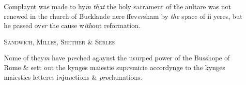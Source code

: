 \documentclass[12pt, a4paper]{book}
\begin{document}
				\marginpar[\vspace{0.5cm}{\textcolor{Gray}{ceremonies}}]{}
			
		\ifthenelse{\isodd{\thepage}}
		{\reversemarginpar}
		{\normalmarginpar}
		Complaynt was made to hy\textit{m that} the holy sacrament of the
 aultare was not renewed in the church of Bucklande nere
	ffev\textit{er}sham by \textit{the} space of ii yeres, but he passed ov\textit{er} the cause
 	w\textit{ith}out reformation.
 

            
            	
				\begin{center} \begin{large} {\scshape Sandwich, Milles, Shether \& Serles} \end{large} \end{center}
			

            	
				\marginpar[\vspace{0.5cm}{\textcolor{Gray}{n}}]{}
			
			
		\ifthenelse{\isodd{\thepage}}
		{\reversemarginpar}
		{\normalmarginpar}
		Nome of they\textit{m} have p\textit{re}ched agaynst the usurped power of
 the Busshope of Rome \& sett out the kynges maiestie sup\textit{re}micie
 accordynge to the kynges maiesties letteres i\textit{n}ju\textit{n}ctions \& \textit{pro}clamations.


            
\dotfill
						\newpage {} \subsection*{}  \subsection*{}  \subsection*{}  \subsection*{}  \subsection*{}
\end{document}
